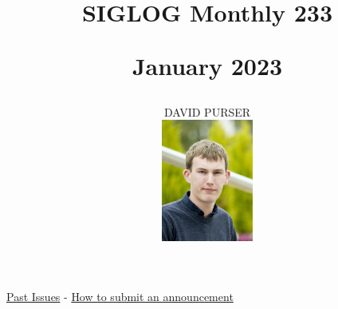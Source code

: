 \documentclass[prodmode,acmtecs]{acmsmall} %
\newcounter{colstart}
\begin{document}
\setcounter{colstart}{\thepage}

\title{{\huge\sc SIGLOG Monthly 233}

 January 2023}
\author{DAVID PURSER
\vspace*{-2.6cm}\begin{flushright}\includegraphics[width=30mm]{dp}\end{flushright}
}

\maketitlee

\href{https://lics.siglog.org/newsletters/}{Past Issues}
 - 
\href{https://lics.siglog.org/newsletters/inst.html}{How to submit an announcement}
\end{document}

